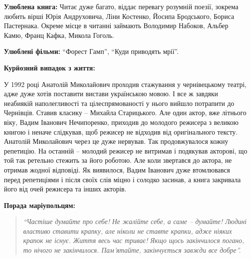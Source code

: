 
\textbf{Улюблена книга:} Читає дуже багато, віддає перевагу розумній поезії,
зокрема любить вірші Юрія Андруховича, Ліни Костенко, Йосипа Бродського, Бориса
Пастернака. Окреме місце в читанні займають Володимир Набоков, Альбер Камю,
Франц Кафка, Микола Гоголь.


\textbf{Улюблені фільми:} \enquote{Форест Гамп}, \enquote{Куди приводять мрії}.

\textbf{Курйозний випадок з життя:} 

У 1992 році Анатолій Миколайович проходив стажування у чернівецькому театрі,
адже дуже хотів поставити вистави українською мовою. І все ж завдяки неабиякій
наполегливості та цілеспрямованості у нього вийшло потрапити до Чернівців.
Ставив класику – Михайла Старицького. Але один актор, вже літнього віку, Вадим
Іванович Нечипоренко, приходив до молодого режисера з великою книгою і неначе
слідкував, щоб режисер не відходив від оригінального тексту. Анатолій
Миколайович через це дуже нервував. Так продовжувалося кожну репетицію. На
останній – молодий режисер не витримав і подякував акторові, що той так
ретельно стежить за його роботою. Але коли звертався до актора, не отримав
жодної відповіді. Як виявилося, Вадим Іванович дуже втомлювався перед
репетиціями і після своїх слів міцно і солодко засинав, а книга закривала його
від очей режисера та інших акторів.


\textbf{Порада маріупольцям:} 

\begin{quote}
\em\enquote{Частіше думайте про себе! Не жалійте себе, а саме – думайте! Людині властиво
ставити крапку, але ніколи не ставте крапки, адже ніяких крапок не існує. Життя
весь час триває! Якщо щось закінчилося погано, то нічого не закінчилося.
Пам’ятайте, закінчується завжди все добре}.
\end{quote}


